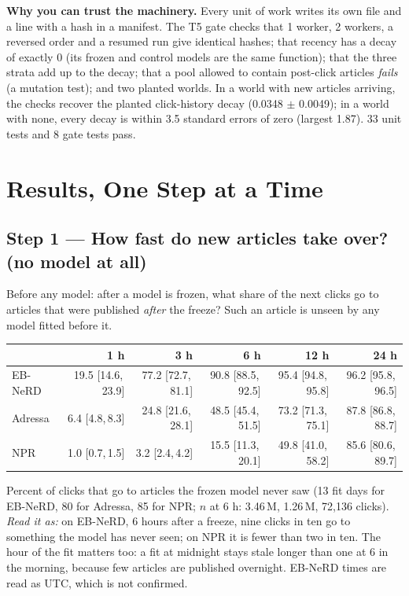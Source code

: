 \documentclass[11pt,a4paper]{article}
\newcommand{\ci}[2]{[#1,\,#2]}
\begin{document}
\textbf{Why you can trust the machinery.} Every unit of work writes its own file and a line with a hash in a manifest. The T5 gate checks that 1 worker, 2 workers, a reversed order and a resumed run give identical hashes; that recency has a decay of exactly 0 (its frozen and control models are the same function); that the three strata add up to the decay; that a pool allowed to contain post-click articles \emph{fails} (a mutation test); and two planted worlds. In a world with new articles arriving, the checks recover the planted click-history decay (0.0348 $\pm$ 0.0049); in a world with none, every decay is within 3.5 standard errors of zero (largest 1.87). 33 unit tests and 8 gate tests pass.

\section{Results, One Step at a Time}
\subsection{Step 1 --- How fast do new articles take over? (no model at all)}
Before any model: after a model is frozen, what share of the next clicks go to articles that were published \emph{after} the freeze? Such an article is unseen by any model fitted before it.
\begin{center}\small
\begin{tabular}{@{}lrrrrr@{}}
\toprule
 & 1 h & 3 h & 6 h & 12 h & 24 h\\
\midrule
EB-NeRD & 19.5 \ci{14.6}{23.9} & 77.2 \ci{72.7}{81.1} & \cellcolor{green!15}90.8 \ci{88.5}{92.5} & 95.4 \ci{94.8}{95.8} & 96.2 \ci{95.8}{96.5}\\
Adressa & 6.4 \ci{4.8}{8.3} & 24.8 \ci{21.6}{28.1} & \cellcolor{green!15}48.5 \ci{45.4}{51.5} & 73.2 \ci{71.3}{75.1} & 87.8 \ci{86.8}{88.7}\\
NPR & 1.0 \ci{0.7}{1.5} & 3.2 \ci{2.4}{4.2} & \cellcolor{green!15}15.5 \ci{11.3}{20.1} & 49.8 \ci{41.0}{58.2} & 85.6 \ci{80.6}{89.7}\\
\bottomrule
\end{tabular}
\end{center}
Percent of clicks that go to articles the frozen model never saw (13 fit days for EB-NeRD, 80 for Adressa, 85 for NPR; $n$ at 6 h: 3.46\,M, 1.26\,M, 72,136 clicks). \textit{Read it as:} on EB-NeRD, 6 hours after a freeze, nine clicks in ten go to something the model has never seen; on NPR it is fewer than two in ten. The hour of the fit matters too: a fit at midnight stays stale longer than one at 6 in the morning, because few articles are published overnight. EB-NeRD times are read as UTC, which is not confirmed.
\end{document}
